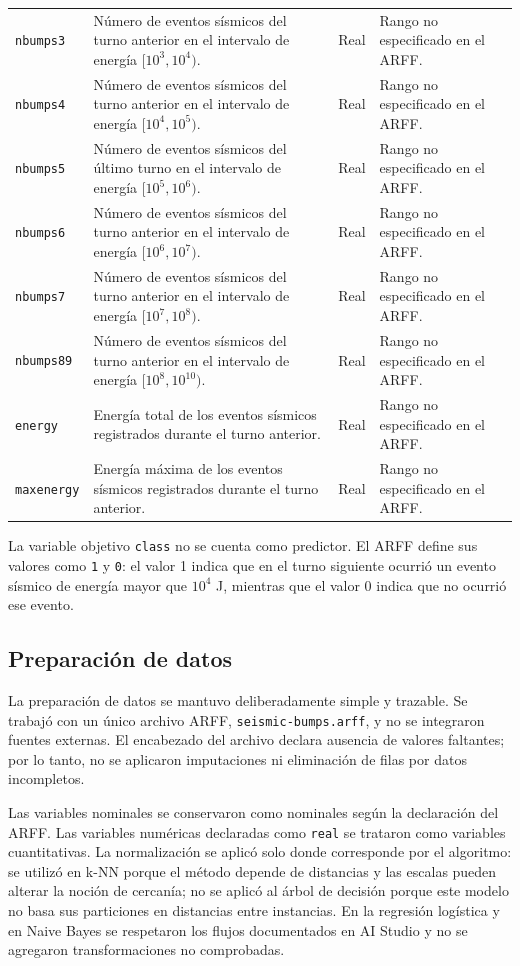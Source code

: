 \documentclass[12pt,a4paper]{article}
\begin{document}
{\begin{longtable}{@{}p{}p{}p{}p{}@{}}
\texttt{nbumps3} & Número de eventos sísmicos del turno anterior en el intervalo de energía $[10^3,10^4)$. & Real & Rango no especificado en el ARFF. \\
\texttt{nbumps4} & Número de eventos sísmicos del turno anterior en el intervalo de energía $[10^4,10^5)$. & Real & Rango no especificado en el ARFF. \\
\texttt{nbumps5} & Número de eventos sísmicos del último turno en el intervalo de energía $[10^5,10^6)$. & Real & Rango no especificado en el ARFF. \\
\texttt{nbumps6} & Número de eventos sísmicos del turno anterior en el intervalo de energía $[10^6,10^7)$. & Real & Rango no especificado en el ARFF. \\
\texttt{nbumps7} & Número de eventos sísmicos del turno anterior en el intervalo de energía $[10^7,10^8)$. & Real & Rango no especificado en el ARFF. \\
\texttt{nbumps89} & Número de eventos sísmicos del turno anterior en el intervalo de energía $[10^8,10^{10})$. & Real & Rango no especificado en el ARFF. \\
\texttt{energy} & Energía total de los eventos sísmicos registrados durante el turno anterior. & Real & Rango no especificado en el ARFF. \\
\texttt{maxenergy} & Energía máxima de los eventos sísmicos registrados durante el turno anterior. & Real & Rango no especificado en el ARFF. \\
\end{longtable}
}

La variable objetivo \texttt{class} no se cuenta como predictor. El ARFF define sus valores como \texttt{1} y \texttt{0}: el valor 1 indica que en el turno siguiente ocurrió un evento sísmico de energía mayor que $10^4$ J, mientras que el valor 0 indica que no ocurrió ese evento.

\subsection{Preparación de datos}
La preparación de datos se mantuvo deliberadamente simple y trazable. Se trabajó con un único archivo ARFF, \texttt{seismic-bumps.arff}, y no se integraron fuentes externas. El encabezado del archivo declara ausencia de valores faltantes; por lo tanto, no se aplicaron imputaciones ni eliminación de filas por datos incompletos.

Las variables nominales se conservaron como nominales según la declaración del ARFF. Las variables numéricas declaradas como \texttt{real} se trataron como variables cuantitativas. La normalización se aplicó solo donde corresponde por el algoritmo: se utilizó en k-NN porque el método depende de distancias y las escalas pueden alterar la noción de cercanía; no se aplicó al árbol de decisión porque este modelo no basa sus particiones en distancias entre instancias. En la regresión logística y en Naive Bayes se respetaron los flujos documentados en AI Studio y no se agregaron transformaciones no comprobadas.
\end{document}

